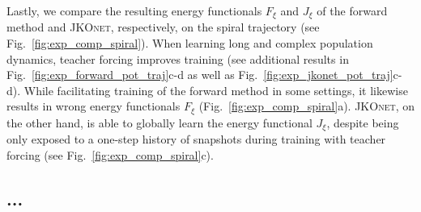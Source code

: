Lastly, we compare the resulting energy functionals $F_\xi$ and $J_\xi$ of the forward method and \textsc{JKOnet}, respectively, on the spiral trajectory (see Fig.~\ref{fig:exp_comp_spiral}).
When learning long and complex population dynamics, teacher forcing improves training (see additional results in Fig.~\ref{fig:exp_forward_pot_traj}c-d as well as Fig.~\ref{fig:exp_jkonet_pot_traj}c-d).
While facilitating training of the forward method in some settings, it likewise results in wrong energy functionals $F_\xi$ (Fig.~\ref{fig:exp_comp_spiral}a).
\textsc{JKOnet}, on the other hand, is able to globally learn the energy functional $J_\xi$, despite being only exposed to a one-step history of snapshots during training with teacher forcing (see Fig.~\ref{fig:exp_comp_spiral}c).

\subsection{...} \label{sec:eval_cell}

